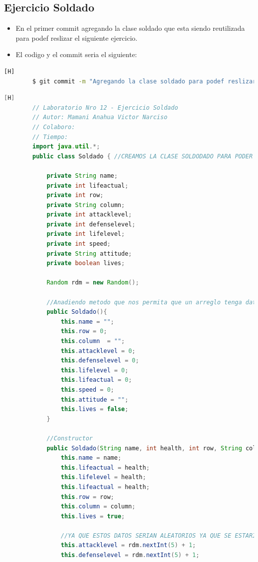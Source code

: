\documentclass{article}
\begin{document}
	\subsection{Ejercicio Soldado}
	\begin{itemize}	
		\item En el primer commit agregando la clase soldado que esta siendo reutilizada para podef reslizar el siguiente ejercicio.
		\item El codigo y el commit seria el siguiente:
	\end{itemize}	
	\begin{lstlisting}[language=bash,caption={Commit}][H]
		$ git commit -m "Agregando la clase soldado para podef reslizar el siguiente ejercicio "
	\end{lstlisting}	
	\begin{lstlisting}[language=java,caption={Las lineas de codigos del metodo creado:}][H]
		// Laboratorio Nro 12 - Ejercicio Soldado
		// Autor: Mamani Anahua Victor Narciso
		// Colaboro:
		// Tiempo:
		import java.util.*;
		public class Soldado { //CREAMOS LA CLASE SOLDODADO PARA PODER USAR UN ARREGLO BIDIMENSIONAL DONDE NECESITAMOS LA VIDA , EL NOMBRE DEL SOLDADO Y TAMBIEN SU POSICION COMO LA FILA Y LA COLUMNA   
		
			private String name;
			private int lifeactual;
			private int row;
			private String column;
			private int attacklevel;
			private int defenselevel;
			private int lifelevel;
			private int speed;
			private String attitude;
			private boolean lives;
		
			Random rdm = new Random();
		
			//Anadiendo metodo que nos permita que un arreglo tenga datos nulos si este esta vacio
			public Soldado(){
				this.name = "";
				this.row = 0;
				this.column  = "";
				this.attacklevel = 0;
				this.defenselevel = 0;
				this.lifelevel = 0;
				this.lifeactual = 0;
				this.speed = 0;
				this.attitude = "";
				this.lives = false;
			}
		
			//Constructor
			public Soldado(String name, int health, int row, String column){
				this.name = name;
				this.lifeactual = health;
				this.lifelevel = health;
				this.lifeactual = health;
				this.row = row;
				this.column = column;
				this.lives = true;
				
				//YA QUE ESTOS DATOS SERIAN ALEATORIOS YA QUE SE ESTARIA CREANDO EL SOLDADO TENDRIAMOS DATOS QUE SERIAN COMO ATTACKLEVEL DEFENSELEVEL EL CUAL TENDRIAN QUE SER ALEATORIOS    
				this.attacklevel = rdm.nextInt(5) + 1;
				this.defenselevel = rdm.nextInt(5) + 1;
		

\end{lstlisting}
\end{document}
